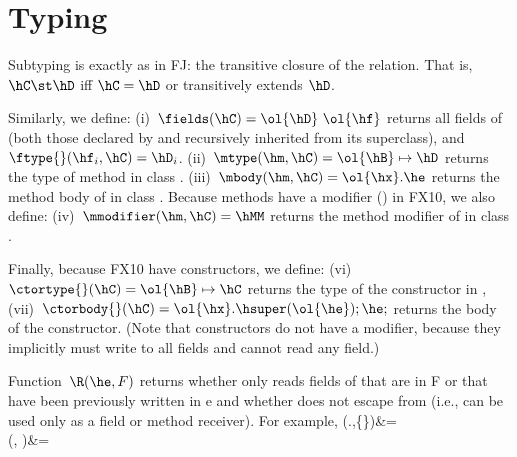 \documentclass[9pt,a4paper]{article}
\begin{document}
\section{Typing}
{Subtyping} is exactly as in FJ:
    the transitive closure of the \hextends relation.
That is, $\hC \st \hD$ iff $\hC=\hD$ or \hC transitively extends $\hD$.

Similarly, we define:
(i)~$\fields(\hC)=\ol{\hD}~\ol{\hf}$ returns all fields of \hC (both those declared by \hC and recursively inherited from its superclass),
    and~$\ftype{}(\hf_i,\hC) =\hD_i$.
(ii)~$\mtype(\hm,\hC) = \ol{\hB}\mapsto\hD$ returns the type of method \hm in class \hC.
(iii)~$\mbody(\hm,\hC) = \ol{\hx}.\he$ returns the method body of \hm in class \hC.
Because methods have a modifier (\hMM) in FX10, we also define:
(iv)~$\mmodifier(\hm,\hC) = \hMM$ returns the method modifier of \hm in class \hC.

Finally, because FX10 have constructors, we define:
(vi)~$\ctortype{}(\hC) = \ol{\hB}\mapsto\hC$ returns the type of the constructor in \hC,
(vii)~$\ctorbody{}(\hC) = \ol{\hx}.\hsuper(\ol{\he});\he;$ returns the body of the constructor.
(Note that constructors do not have a modifier, because they implicitly must write to all fields and cannot read any field.)


Function~$\R(\he,F)$ returns whether
    \he only reads fields of \this that are in F or that have been previously written in e
    and whether
    \this does not escape from \he (i.e., \this can be used only as a field or method receiver).
For example,
    \R(\this.\hf,\{\hf\})&=\htrue\\
    \R(, \emptyset)&=\htrue\\
\eeq
\end{document}
